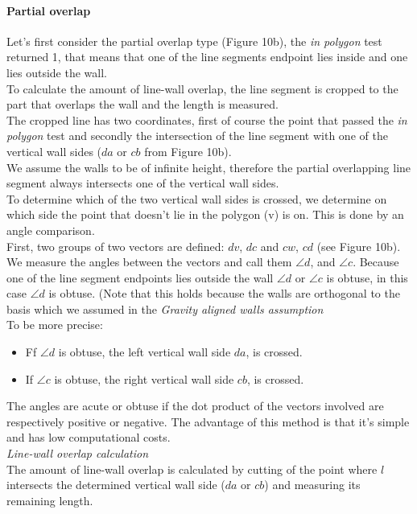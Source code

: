 	\paragraph{Partial overlap}
	Let's first consider the partial overlap type (Figure 10b), the \emph{in polygon} test
	returned 1, that means that one of the line segments endpoint lies inside
	and one lies outside the wall.\\
	To calculate the amount of line-wall overlap, the line segment is cropped to the
	part that overlaps the wall and the length is measured.\\
	The cropped line has two coordinates, first of course the point that passed
	the \emph{in polygon} test and secondly the intersection of the line
	segment with one of the vertical wall sides ($da$ or $cb$ from Figure 10b).\\
	We assume the walls to be of infinite height, therefore the 
	partial overlapping line segment always intersects one of the
	vertical wall sides.\\
	To determine which of the two vertical wall sides is crossed, we determine
	on which side the point that doesn't lie in the polygon (v) is on.  This is
	done by an angle comparison.\\
	First, two groups of two vectors are defined: $dv$, $dc$ and $cw$, $cd$ (see Figure 10b).
	We measure the angles between the vectors and call them $\angle d$, and
	$\angle c$. 
	Because one of the line segment endpoints lies outside
	the wall $\angle d$ or $\angle c$ is obtuse, in this case $\angle d$ is obtuse.
	(Note that this holds because the walls are orthogonal to the basis
	which we assumed in the \emph{Gravity aligned walls assumption}\\
	To be more precise: 
	\begin{itemize}
	\item Ff $\angle d$ is obtuse, the left vertical wall side $da$, is
	crossed. \\
	\item If $\angle c$ is obtuse, the right vertical wall side $cb$, is
	crossed. \\
	\end{itemize}
	The angles are acute or obtuse if the dot product of the vectors involved
	are respectively positive or negative. The advantage of this method is that
	it's simple and has low computational costs.\\
	
	\emph{Line-wall overlap calculation}\\
	The amount of line-wall overlap is calculated by cutting of the
	point where $l$ intersects the determined vertical wall side ($da$ or
	$cb$) and measuring its remaining length.\\

